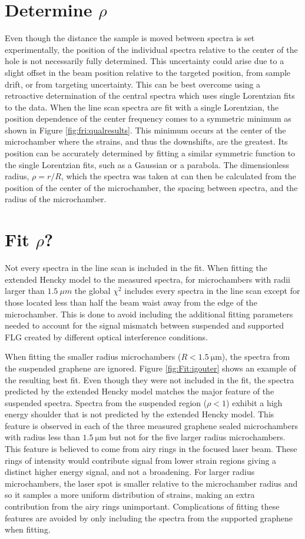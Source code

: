 \section*{Determine $\rho$}
Even though the distance the sample is moved between spectra is set experimentally, the position of the individual spectra relative to the center of the hole is not necessarily fully determined.
This uncertainty could arise due to a slight offset in the beam position relative to the targeted position, from sample drift, or from targeting uncertainty.
This can be best overcome using a retroactive determination of the central spectra which uses single Lorentzian fits to the data.
When the line scan spectra are fit with a single Lorentzian, the position dependence of the center frequency comes to a symmetric minimum as shown in Figure \ref{fig:fri:qualresults}.
This minimum occurs at the center of the microchamber where the strains, and thus the downshifts, are the greatest.
Its position can be accurately determined by fitting a similar symmetric function to the single Lorentzian fits, such as a Gaussian or a parabola.
The dimensionless radius, $\rho=r/R$, which the spectra was taken at can then be calculated from the position of the center of the microchamber, the spacing between spectra, and the radius of the microchamber.

\section*{Fit $\rho$?}
Not every spectra in the line scan is included in the fit.
When fitting the extended Hencky model to the measured spectra, for microchambers with radii larger than $1.5 \ \mu m$ the global $\chi^2$ includes every spectra in the line scan except for those located less than half the beam waist away from the edge of the microchamber.
This is done to avoid including the additional fitting parameters needed to account for the signal mismatch between suspended and supported FLG created by different optical interference conditions.

When fitting the smaller radius microchambers ($R<1.5 \ \mathrm{\mu m}$), the spectra from the suspended graphene are ignored.
Figure \ref{fig:Fit:igouter} shows an example of the resulting best fit.
Even though they were not included in the fit, the spectra predicted by the extended Hencky model matches the major feature of the suspended spectra.
Spectra from the suspended region ($\rho<1$) exhibit a high energy shoulder that is not predicted by the extended Hencky model.
This feature is observed in each of the three measured graphene sealed microchambers with radius less than $1.5 \ \mathrm{\mu m}$ but not for the five larger radius microchambers.
This feature is believed to come from airy rings in the focused laser beam.
These rings of intensity would contribute signal from lower strain regions giving a distinct higher energy signal, and not a broadening.
For larger radius microchambers, the laser spot is smaller relative to the microchamber radius and so it samples a more uniform distribution of strains, making an extra contribution from the airy rings unimportant.
Complications of fitting these features are avoided by only including the spectra from the supported graphene when fitting.  


